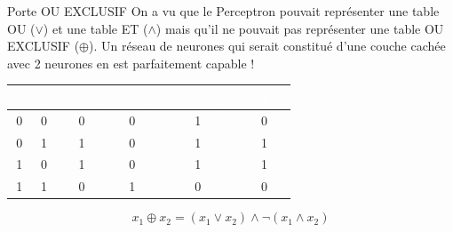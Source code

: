 \begin{frame}{Porte OU EXCLUSIF}
	On a vu que le Perceptron pouvait représenter une table OU ($\lor$) et une table ET ($\land$) mais qu'il ne pouvait pas représenter une table OU EXCLUSIF ($\oplus$). Un réseau de neurones qui serait constitué d'une couche cachée avec 2 neurones en est parfaitement capable !
		
	\begin{table}
		\centering
		\renewcommand{\arraystretch}{1.3} 
		\begin{tabular}{|c|c|c|c|c|c|}
			\hline
			\rowcolor{blue!80!black} %
			\textcolor{white}{\textbf{$x_1$}} & 
			\textcolor{white}{\textbf{$x_2$}} & 
			\textcolor{white}{\textbf{$x_1 \lor x_2$}} & 
			\textcolor{white}{\textbf{$x_1 \land x_2$}} & 
			\textcolor{white}{\textbf{$\neg (x_1 \land x_2)$}} & 
			\textcolor{white}{\textbf{$x_1 \oplus x_2$}} \\
			\hline
			0 & 0 & 0 & 0 & 1 & 0 \\
			\hline
			0 & 1 & 1 & 0 & 1 & 1 \\
			\hline
			1 & 0 & 1 & 0 & 1 & 1 \\
			\hline
			1 & 1 & 0 & 1 & 0 & 0 \\
			\hline
		\end{tabular}
	\end{table}
	
	\begin{equation*}
		x_1 \oplus x_2 = (x_1 \lor x_2) \land \neg (x_1 \land x_2)
	\end{equation*}
	
\end{frame}

